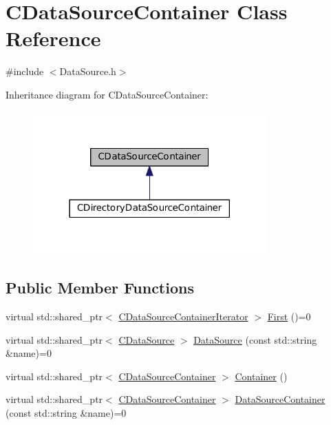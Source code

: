\hypertarget{classCDataSourceContainer}{}\section{C\+Data\+Source\+Container Class Reference}
\label{classCDataSourceContainer}


{\ttfamily \#include $<$Data\+Source.\+h$>$}



Inheritance diagram for C\+Data\+Source\+Container\+:\nopagebreak
\begin{figure}[H]
\begin{center}
\leavevmode
\includegraphics[width=254pt]{classCDataSourceContainer__inherit__graph}
\end{center}
\end{figure}
\subsection*{Public Member Functions}
\begin{DoxyCompactItemize}
\item 
virtual std\+::shared\+\_\+ptr$<$ \hyperlink{classCDataSourceContainerIterator}{C\+Data\+Source\+Container\+Iterator} $>$ \hyperlink{classCDataSourceContainer_ad50184dd4ec1c79c776fe0d7d9910925}{First} ()=0
\item 
virtual std\+::shared\+\_\+ptr$<$ \hyperlink{classCDataSource}{C\+Data\+Source} $>$ \hyperlink{classCDataSourceContainer_aea214236c4ed2aef231072b909982f7d}{Data\+Source} (const std\+::string \&name)=0
\item 
virtual std\+::shared\+\_\+ptr$<$ \hyperlink{classCDataSourceContainer}{C\+Data\+Source\+Container} $>$ \hyperlink{classCDataSourceContainer_a040c80f46e9d2df36b494290a945e61a}{Container} ()
\item 
virtual std\+::shared\+\_\+ptr$<$ \hyperlink{classCDataSourceContainer}{C\+Data\+Source\+Container} $>$ \hyperlink{classCDataSourceContainer_abebf1b9a6168b6783ee9753df612e511}{Data\+Source\+Container} (const std\+::string \&name)=0
\end{DoxyCompactItemize}


